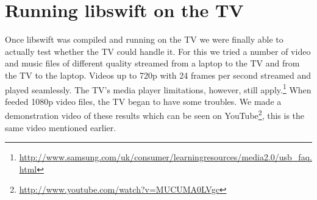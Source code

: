 \section{Running libswift on the TV}
Once libswift was compiled and running on the TV we were finally able to actually test whether the TV could handle it.
For this we tried a number of video and music files of different quality streamed from a laptop to the TV and from the TV to the laptop.
Videos up to 720p with 24 frames per second streamed and played seamlessly.
The TV's media player limitations, however, still apply.\footnote{\url{http://www.samsung.com/uk/consumer/learningresources/media2.0/usb\_faq.html}}
When feeded 1080p video files, the TV began to have some troubles.
We made a demonstration video of these results which can be seen on YouTube\footnote{\url{http://www.youtube.com/watch?v=MUCUMA0LVgc}},
this is the same video mentioned earlier.

